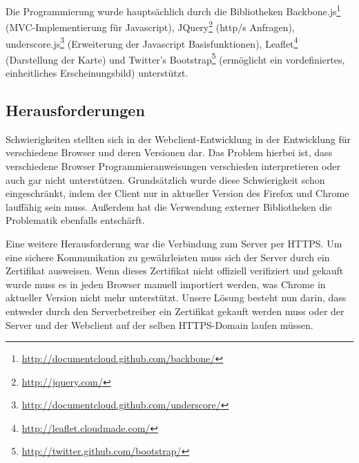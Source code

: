 Die Programmierung wurde hauptsächlich durch die Bibliotheken 
Backbone.js\footnote{\url{http://documentcloud.github.com/backbone/}} (MVC-Implementierung für Javascript), 
JQuery\footnote{\url{http://jquery.com/}} (http/s Anfragen), 
underscore.js\footnote{\url{http://documentcloud.github.com/underscore/}} (Erweiterung der Javascript Basisfunktionen),
Leaflet\footnote{\url{http://leaflet.cloudmade.com/}} (Darstellung der Karte) und 
Twitter's Bootstrap\footnote{\url{http://twitter.github.com/bootstrap/}} (ermöglicht ein vordefiniertes, einheitliches Erscheinungsbild) unterstützt.

\subsection*{Herausforderungen}

Schwierigkeiten stellten sich in der Webclient-Entwicklung in der Entwicklung für verschiedene Browser und deren Versionen dar.
Das Problem hierbei ist, dass verschiedene Browser Programmieranweisungen verschieden interpretieren oder auch gar nicht unterstützen. 
Grundsätzlich wurde diese Schwierigkeit schon eingeschränkt, indem der Client nur in aktueller Version des Firefox und Chrome lauffähig sein muss. Außerdem hat die Verwendung externer Bibliotheken die Problematik ebenfalls entschärft.

Eine weitere Herausforderung war die Verbindung zum Server per HTTPS.
Um eine sichere Kommunikation zu gewährleisten muss sich der Server durch ein Zertifikat ausweisen.
Wenn dieses Zertifikat nicht offiziell verifiziert und gekauft wurde muss es in jeden Browser manuell importiert werden, was Chrome in aktueller Version nicht mehr unterstützt.
Unsere Lösung besteht nun darin, dass entweder durch den Serverbetreiber ein Zertifikat gekauft werden muss oder der Server und der Webclient auf der selben HTTPS-Domain laufen müssen.
